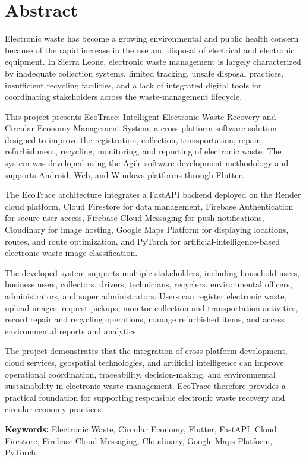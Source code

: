 \chapter*{Abstract}

Electronic waste has become a growing environmental and public health concern
because of the rapid increase in the use and disposal of electrical and electronic
equipment. In Sierra Leone, electronic waste management is largely characterized
by inadequate collection systems, limited tracking, unsafe disposal practices,
insufficient recycling facilities, and a lack of integrated digital tools for coordinating
stakeholders across the waste-management lifecycle.

This project presents EcoTrace: Intelligent Electronic Waste Recovery and
Circular Economy Management System, a cross-platform software solution designed
to improve the registration, collection, transportation, repair, refurbishment,
recycling, monitoring, and reporting of electronic waste. The system was developed
using the Agile software development methodology and supports Android, Web, and
Windows platforms through Flutter.

The EcoTrace architecture integrates a FastAPI backend deployed on the Render
cloud platform, Cloud Firestore for data management, Firebase Authentication for
secure user access, Firebase Cloud Messaging for push notifications, Cloudinary for
image hosting, Google Maps Platform for displaying locations, routes, and route
optimization, and PyTorch for artificial-intelligence-based electronic waste image
classification.

The developed system supports multiple stakeholders, including household users,
business users, collectors, drivers, technicians, recyclers, environmental officers,
administrators, and super administrators. Users can register electronic waste,
upload images, request pickups, monitor collection and transportation activities,
record repair and recycling operations, manage refurbished items, and access
environmental reports and analytics.

The project demonstrates that the integration of cross-platform development,
cloud services, geospatial technologies, and artificial intelligence can improve
operational coordination, traceability, decision-making, and environmental
sustainability in electronic waste management. EcoTrace therefore provides a
practical foundation for supporting responsible electronic waste recovery and
circular economy practices.

\vspace{0.5cm}
\noindent\textbf{Keywords:} Electronic Waste, Circular Economy, Flutter, FastAPI,
Cloud Firestore, Firebase Cloud Messaging, Cloudinary, Google Maps Platform,
PyTorch.
